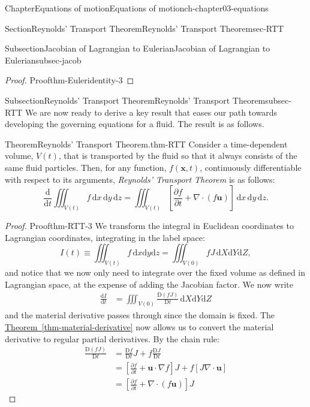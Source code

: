 \documentclass[oneside,10pt,]{book}
\newcommand{\xreffont}{\relax}
\numberwithin{equation}{section}
\newcommand{\de}{\mathrm{d}}
\newcommand{\dd}[2]{\frac{\de#1}{\de#2}}
\newcommand{\DD}[2]{\frac{\mathrm{D}#1}{\mathrm{D}#2}}
\newcommand{\pd}[2]{\frac{\partial#1}{\partial#2}}
\newcommand{\bx}{\boldsymbol{x}}
\newcommand{\bu}{\boldsymbol{u}}
\begin{document}
\begin{chapterptx}{Chapter}{Equations of motion}{}{Equations of motion}{}{}{ch-chapter03-equations}
\begin{sectionptx}{Section}{Reynolds' Transport Theorem}{}{Reynolds' Transport Theorem}{}{}{sec-RTT}
\begin{subsectionptx}{Subsection}{Jacobian of Lagrangian to Eulerian}{}{Jacobian of Lagrangian to Eulerian}{}{}{subsec-jacob}
\begin{proof}{Proof}{}{thm-Euleridentity-3}
\end{proof}
\end{subsectionptx}
%
%
\typeout{************************************************}
\typeout{************************************************}
%
\begin{subsectionptx}{Subsection}{Reynolds' Transport Theorem}{}{Reynolds' Transport Theorem}{}{}{subsec-RTT}
We are now ready to derive a key result that eases our path towards developing the governing equations for a fluid. The result is as follows.%
\begin{theorem}{Theorem}{Reynolds' Transport Theorem.}{}{thm-RTT}%
Consider a time-dependent volume, \(V(t)\), that is transported by the fluid so that it always consists of the same fluid particles. Then, for any function, \(f(\bx, t)\), continuously differentiable with respect to its arguments, \emph{Reynolds' Transport Theorem} is as follows:%
\begin{equation}
\dd{}{t} \iiint_{V(t)} f \, \de{x} \, \de{y} \, \de{z} = \iiint_{V(t)} \left[
\pd{f}{t} + \nabla \cdot (f\bu)\right] \, \de{x} \, \de{y} \, \de{z}.\label{eqn-RTT}
\end{equation}
%
\end{theorem}
\begin{proof}{Proof}{}{thm-RTT-3}
We transform the integral in Euclidean coordinates to Lagrangian coordinates, integrating in the label space:%
\begin{equation*}
I(t) \equiv \iiint_{V(t)} f \, \de{x} \de{y} \de{z}
= \iiint_{V(0)} f J \, \de{X} \de{Y} \de{Z},
\end{equation*}
and notice that we now only need to integrate over the fixed volume as defined in Lagrangian space, at the expense of adding the Jacobian factor. We now write%
\begin{align*}
\dd{I}{t} &= \iiint_{V(0)} \DD{(fJ)}{t} \, \de{X}\de{Y}\de{Z} 
\end{align*}
and the material derivative passes through since the domain is fixed. The \hyperref[thm-material-derivative]{Theorem~{\xreffont\ref{thm-material-derivative}}} now allows us to convert the material derivative to regular partial derivatives. By the chain rule:%
\begin{align*}
\DD{(fJ)}{t} &= \DD{f}{t}J + f\DD{J}{t} \\
&= \left[ \pd{f}{t} + \bu \cdot \nabla f\right]J
+ f \left[J \nabla \cdot \bu\right] \\
&= \left[ \pd{f}{t} + \nabla \cdot (f\bu) \right]J 

\end{align*}
\end{proof}
\end{subsectionptx}
\end{sectionptx}
\end{chapterptx}
\end{document}
